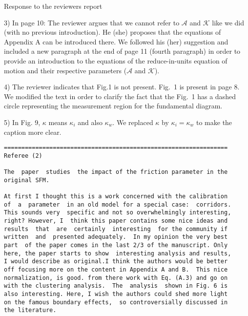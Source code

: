 \documentclass[a4paper,12pt]{letter}
\begin{document}
\begin{letter}{Response to the reviewers report}
{%
3) In page 10: The reviewer argues that we cannot refer to $\mathcal{A}$ and $\mathcal{K}$ like we did (with no previous introduction). He (she) proposes that the equations of Appendix A can be introduced there. We followed his (her) suggestion and included a new paragraph at the end of page 11 (fourth paragraph) in order to provide an introduction to the equations of the reduce-in-units equation of motion and their respective parameters ($\mathcal{A}$ and $\mathcal{K}$).  



4) The reviewer indicates that Fig.1 is not present. Fig.~1 is present in page 8.  \\

We modified the text in order to clarify the fact that the Fig.~1 has a 
dashed circle representing the measurement region for the fundamental diagram. 

5) In Fig. 9, $\kappa$ means $\kappa_i$ and also $\kappa_w$. We replaced $\kappa$ by $\kappa_i = \kappa_w$ to make the caption more clear.   


}

\newpage

\begin{verbatim}
================================================================
Referee (2)

The  paper  studies  the impact of the friction parameter in the 
original SFM.

At first I thought this is a work concerned with the calibration 
of  a  parameter  in an old model for a special case:  corridors. 
This sounds very  specific and not so overwhelmingly interesting,
right? However, I  think this paper contains some nice ideas and 
results  that  are  certainly  interesting  for the community if 
written  and  presented adequately.  In my opinion the very best 
part  of the paper comes in the last 2/3 of the manuscript. Only 
here, the paper starts to show  interesting analysis and results,
I would describe as original.I think the authors would be better
off focusing more on the content in Appendix A and B.  This nice 
normalization, is good. from there work with Eq. (A.3) and go on 
with the clustering analysis.  The  analysis  shown in Fig. 6 is 
also interesting. Here, I wish the authors could shed more light
on the famous boundary effects,  so controversially discussed in
the literature.


\end{verbatim}
\end{letter}
\end{document}
